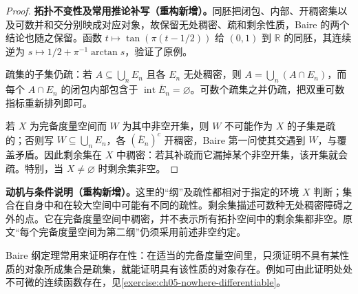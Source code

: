 \documentclass[../../main.tex]{subfiles}
\begin{document}
\begin{proof}
\textbf{拓扑不变性及常用推论补写（重构新增）。}同胚把闭包、内部、开稠密集以及可数并和交分别映成对应对象，故保留无处稠密、疏和剩余性质，Baire 的两个结论也随之保留。函数 $t\mapsto\tan(\pi(t-1/2))$ 给 $(0,1)$ 到 $\mathbb R$ 的同胚，其连续逆为 $s\mapsto1/2+\pi^{-1}\arctan s$，验证了原例。

疏集的子集仍疏：若 $A\subseteq\bigcup_nE_n$ 且各 $E_n$ 无处稠密，则 $A=\bigcup_n(A\cap E_n)$，而每个 $A\cap E_n$ 的闭包内部包含于 $\operatorname{int}\overline E_n=\varnothing$。可数个疏集之并仍疏，把双重可数指标重新排列即可。

若 $X$ 为完备度量空间而 $W$ 为其中非空开集，则 $W$ 不可能作为 $X$ 的子集是疏的；否则写 $W\subseteq\bigcup_nE_n$，各 $(\overline E_n)^c$ 开稠密，Baire 第一问使其交遇到 $W$，与覆盖矛盾。因此剩余集在 $X$ 中稠密：若其补疏而它漏掉某个非空开集，该开集就会疏。特别，当 $X\ne\varnothing$ 时剩余集非空。
\end{proof}
\begin{remark}
\textbf{动机与条件说明（重构新增）。}这里的“纲”及疏性都相对于指定的环境 $X$ 判断；集合在自身中和在较大空间中可能有不同的疏性。剩余集描述可数种无处稠密障碍之外的点。它在完备度量空间中稠密，并不表示所有拓扑空间中的剩余集都非空。原文“每个完备度量空间为第二纲”仍须采用前述非空约定。
\end{remark}
Baire 纲定理常用来证明存在性：在适当的完备度量空间里，只须证明不具有某性质的对象所成集合是疏集，就能证明具有该性质的对象存在。例如可由此证明处处不可微的连续函数存在，见\cref{exercise:ch05-nowhere-differentiable}。
\end{document}
